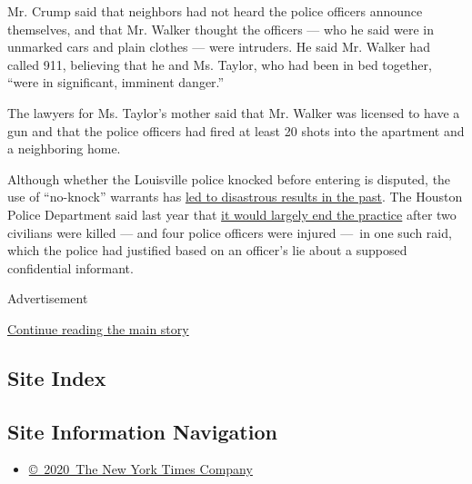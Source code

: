 Mr. Crump said that neighbors had not heard the police officers announce
themselves, and that Mr. Walker thought the officers --- who he said
were in unmarked cars and plain clothes --- were intruders. He said Mr.
Walker had called 911, believing that he and Ms. Taylor, who had been in
bed together, ``were in significant, imminent danger.''

The lawyers for Ms. Taylor's mother said that Mr. Walker was licensed to
have a gun and that the police officers had fired at least 20 shots into
the apartment and a neighboring home.

Although whether the Louisville police knocked before entering is
disputed, the use of ``no-knock'' warrants has
\href{https://www.nytimes3xbfgragh.onion/interactive/2017/03/18/us/forced-entry-warrant-drug-raid.html}{led
to disastrous results in the past}. The Houston Police Department said
last year that
\href{https://www.nytimes3xbfgragh.onion/2019/02/19/us/no-knock-warrant-houston-police.html}{it
would largely end the practice} after two civilians were killed --- and
four police officers were injured ---~in one such raid, which the police
had justified based on an officer's lie about a supposed confidential
informant.

Advertisement

\protect\hyperlink{after-bottom}{Continue reading the main story}

\hypertarget{site-index}{%
\subsection{Site Index}\label{site-index}}

\hypertarget{site-information-navigation}{%
\subsection{Site Information
Navigation}\label{site-information-navigation}}

\begin{itemize}
\tightlist
\item
  \href{https://help.nytimes3xbfgragh.onion/hc/en-us/articles/115014792127-Copyright-notice}{©~2020~The
  New York Times Company}
\end{itemize}

